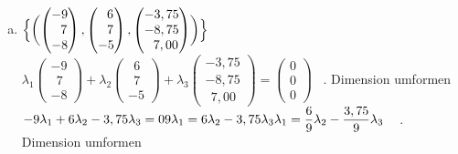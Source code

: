 \documentclass[10pt,ngerman]{scrartcl}
\begin{document}
\begin{enumerate}[1.]
\begin{enumerate}[(a)]
	\item
	\begin{math}\Bigl\{  \biggl ( \begin{pmatrix}-9 \\ ~~7 \\ -8\end{pmatrix} , \begin{pmatrix}~~6 \\ ~~7 \\ -5\end{pmatrix} , \begin{pmatrix}-3,75 \\ -8,75 \\ ~~7,00\end{pmatrix}\biggr ) \Bigr\} \end{math}
	 \newline~\newline~\newline
	\begin{math}\lambda _1\begin{pmatrix}-9 \\ ~~7 \\ -8\end{pmatrix} + \lambda _2 \begin{pmatrix}~~6 \\ ~~7 \\ -5\end{pmatrix} + \lambda _3 \begin{pmatrix}-3,75 \\ -8,75 \\ ~~7,00\end{pmatrix} = \begin{pmatrix}0 \\ 0 \\ 0\end{pmatrix} \end{math} \newline~. Dimension umformen\newline
	 \begin{math}
	-9 \lambda _1 + 6 \lambda _2 - 3,75 \lambda _3 = 0 \newline
	9 \lambda _1 = 6 \lambda _2 - 3,75 \lambda _3 \newline
	\lambda _1 = \dfrac{6}{9} \lambda _2 - \dfrac{3,75}{9} \lambda _3 
	\end{math}
	\newline ~ . Dimension umformen\newline

\end{enumerate}
\end{enumerate}
\end{document}
